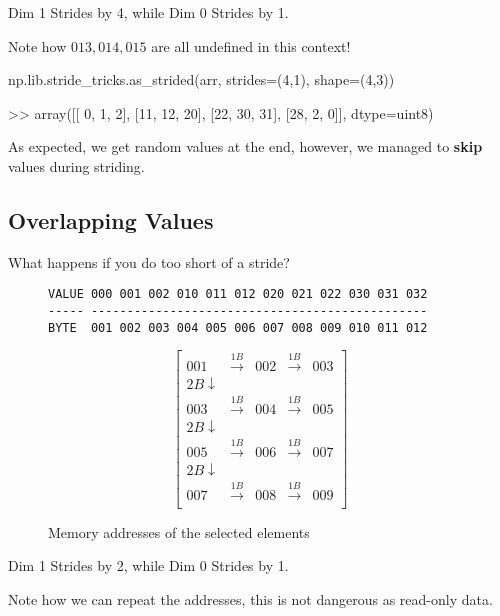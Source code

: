 \documentclass[oneside, 12pt]{report}
\begin{document}
\begin{shaded}
Dim 1 Strides by 4, while Dim 0 Strides by 1.

Note how $013, 014, 015$ are all undefined in this context!
\end{shaded}

\begin{python}
np.lib.stride_tricks.as_strided(arr, strides=(4,1), shape=(4,3))

>> array([[ 0,  1,  2],
          [11, 12, 20],
          [22, 30, 31],
          [28,  2,  0]], dtype=uint8)
\end{python}

As expected, we get random values at the end, however, we managed to \textbf{skip} values during striding.

\subsection{Overlapping Values}

What happens if you do too short of a stride?

\begin{figure}[H]
\begin{verbatim}
VALUE 000 001 002 010 011 012 020 021 022 030 031 032
----- -----------------------------------------------
BYTE  001 002 003 004 005 006 007 008 009 010 011 012
\end{verbatim}
\end{figure}

\begin{figure}[H]
\begin{equation*}
\begin{bmatrix}
001 & \xrightarrow{1B} & 002 &\xrightarrow{1B} & 003 \\
2B \downarrow \\
003 & \xrightarrow{1B} & 004 &\xrightarrow{1B} & 005 \\
2B \downarrow \\
005 & \xrightarrow{1B} & 006 &\xrightarrow{1B} & 007 \\
2B \downarrow \\
007 & \xrightarrow{1B} & 008 &\xrightarrow{1B} & 009 \\
\end{bmatrix}
\end{equation*}
\caption{Memory addresses of the selected elements}
\end{figure}

\begin{shaded}
Dim 1 Strides by 2, while Dim 0 Strides by 1.

Note how we can repeat the addresses, this is not dangerous as read-only data.
\end{shaded}
\end{document}
